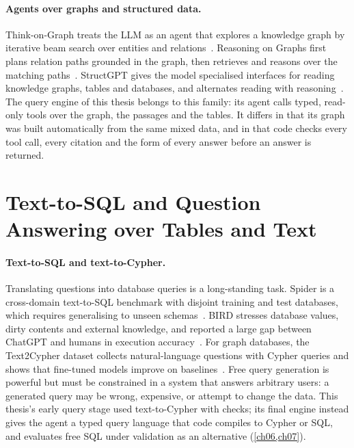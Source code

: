 \paragraph{Agents over graphs and structured data.} Think-on-Graph treats the LLM as an agent that explores a
knowledge graph by iterative beam search over entities and relations~\cite{sun2024thinkongraph}. Reasoning on
Graphs first plans relation paths grounded in the graph, then retrieves and reasons over the matching
paths~\cite{luo2024reasoning}. StructGPT gives the model specialised interfaces for reading knowledge graphs,
tables and databases, and alternates reading with reasoning~\cite{jiang2023structgpt}. The query engine of this
thesis belongs to this family: its agent calls typed, read-only tools over the graph, the passages and the
tables. It differs in that its graph was built automatically from the same mixed data, and in that code checks
every tool call, every citation and the form of every answer before an answer is returned.

\section{Text-to-SQL and Question Answering over Tables and Text}\label{sec:ch02-text-to-sql-and-question-answering-o}

\paragraph{Text-to-SQL and text-to-Cypher.} Translating questions into database queries is a long-standing
task. Spider is a cross-domain text-to-SQL benchmark with disjoint training and test databases, which requires
generalising to unseen schemas~\cite{yu2018spider}. BIRD stresses database values, dirty contents and external
knowledge, and reported a large gap between ChatGPT and humans in execution accuracy~\cite{li2023bird}. For graph
databases, the Text2Cypher dataset collects natural-language questions with Cypher queries and shows that
fine-tuned models improve on baselines~\cite{ozsoy2025text2cypher}. Free query generation is powerful but must be
constrained in a system that answers arbitrary users: a generated query may be wrong, expensive, or attempt to
change the data. This thesis's early query stage used text-to-Cypher with checks; its final engine instead
gives the agent a typed query language that code compiles to Cypher or SQL, and evaluates free SQL under
validation as an alternative (\cref{ch06,ch07}).

